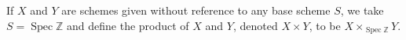 If $X$ and $Y$ are schemes given without reference to any base scheme $S$, we take $S = \operatorname{Spec} \mathbb{Z}$ and define the product of $X$ and $Y$, denoted $X \times Y$, to be $X \times_{\operatorname{Spec} \mathbb{Z}} Y$.
